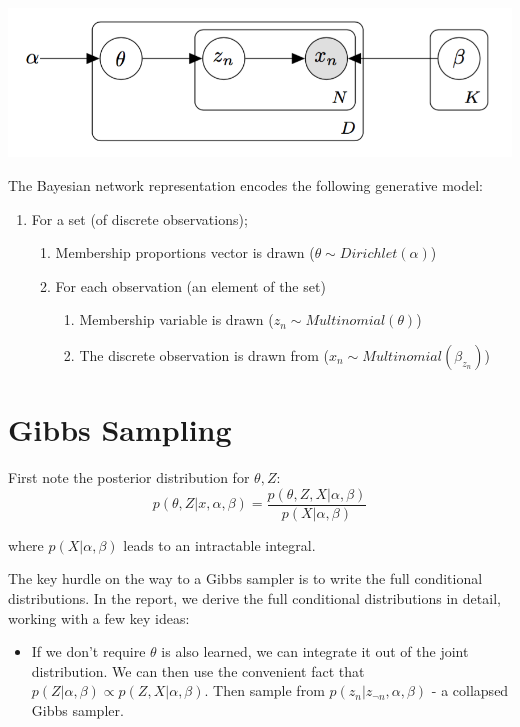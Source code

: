 \documentclass[a0,portrait]{a0poster}
\begin{document}
\begin{multicols}{2}
\vspace{2cm}
\begin{minipage}{\linewidth}%
	\centering%
	\includegraphics[width=.8\linewidth]{pgm}%
	\label{fig:pgm}
\end{minipage}%

\large{
The Bayesian network representation encodes the following generative model:
	\begin{enumerate}
		\item For a set (of discrete observations);
		\begin{enumerate}
			\item Membership proportions vector is drawn ($\theta \sim Dirichlet(\alpha)$)
			\item For each observation (an element of the set)
			\begin{enumerate}
				\item Membership variable is drawn ($z_n \sim Multinomial(\theta)$)
				\item The discrete observation is drawn from ($x_n \sim Multinomial(\beta_{z_n})$)
			\end{enumerate}
		\end{enumerate}
	\end{enumerate}
}


\section{Gibbs Sampling}

\large{
	First note the posterior distribution for $\theta, Z$:
	$$	
	p(\theta, Z | x, \alpha, \beta) = \dfrac{p(\theta, Z, X | \alpha, \beta)}{p(X | \alpha, \beta)}
	$$
	
	where $p(X | \alpha, \beta)$ leads to an intractable integral. 
	
	The key hurdle on the way to a Gibbs sampler is to write the full conditional distributions. In the report, we derive the full conditional distributions in detail, working with a few key ideas:
	
	\begin{itemize}
		\item If we don't require $\theta$ is also learned, we can integrate it out of the joint distribution. We can then use the convenient fact that $p(Z|\alpha, \beta) \propto p(Z, X|\alpha, \beta)$. Then sample from $p(z_n | z_{\neg n}, \alpha, \beta)$ - a collapsed Gibbs sampler.
		

\end{itemize}}
\end{multicols}
\end{document}
